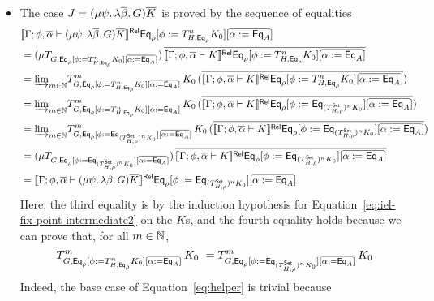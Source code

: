\documentclass{lmcs}
\theoremstyle{plain}\newtheorem{satz}[thm]{Satz}
\newcommand{\set}{\mathsf{Set}}
\begin{document}
\begin{itemize}
\begin{itemize}
\item 
  The case $J = (\mu \psi.\, \lambda \overline{\beta}.\, G) \overline{K}$
is proved by the sequence of equalities 
\[
\begin{split}
& \relsem{\Gamma; \phi, \ol{\alpha} \vdash (\mu \psi.\, \lambda
    \ol{\beta}.\, G) \ol{K}} 
  \Eq_{\rho} [\phi := T^{n}_{H,\Eq_{\rho}} K_0]
  [\overline{\alpha := \Eq_A}] \\
&= (\mu {T_{G, \Eq_{\rho}[\phi := T^{n}_{H,\Eq_{\rho}} K_0][\overline{\alpha := \Eq_A}]}})
  \,\ol{\relsem{\Gamma; \phi, \ol{\alpha} \vdash K}\Eq_{\rho}
  [\phi := T^{n}_{H,\Eq_{\rho}} K_0][\overline{\alpha := \Eq_A}]} \\ 
&= \colim{m \in \nat} {T^m_{G, \Eq_{\rho}[\phi := T^{n}_{H,\Eq_{\rho}} K_0][\overline{\alpha := \Eq_A}]}}\,K_0
  \,(\ol{\relsem{\Gamma; \phi, \ol{\alpha} \vdash K}\Eq_{\rho}
  [\phi := T^{n}_{H,\Eq_{\rho}} K_0][\overline{\alpha := \Eq_A}]}) \\ 
&= \colim{m \in \nat} {T^m_{G, \Eq_{\rho}[\phi := T^{n}_{H,\Eq_{\rho}} K_0][\overline{\alpha := \Eq_A}]}}\,K_0
  \,(\ol{\relsem{\Gamma; \phi, \ol{\alpha} \vdash K}\Eq_{\rho}
  [\phi := \Eq_{(T^{\set}_{H,\rho})^n K_0}][\overline{\alpha := \Eq_A}]}) \\  %
&= \colim{m \in \nat} {T^m_{G, \Eq_{\rho}[\phi := \Eq_{(T^{\set}_{H,\rho})^n K_0}][\overline{\alpha := \Eq_A}]}}\,K_0
  \,(\ol{\relsem{\Gamma; \phi, \ol{\alpha} \vdash K}\Eq_{\rho}
  [\phi := \Eq_{(T^{\set}_{H,\rho})^n K_0}][\overline{\alpha := \Eq_A}]}) \\ 
&= (\mu {T_{G, \Eq_{\rho}[\phi := \Eq_{(T^{\set}_{H,\rho})^n K_0}][\overline{\alpha := \Eq_A}]}})
  \,\ol{\relsem{\Gamma; \phi, \ol{\alpha} \vdash K}\Eq_{\rho}
  [\phi := \Eq_{(T^{\set}_{H,\rho})^n K_0}][\overline{\alpha := \Eq_A}]} \\ 
&= \relsem{\Gamma; \phi, \ol{\alpha} \vdash (\mu \psi.\, \lambda \beta.\, G) \ol{K}}
  \Eq_{\rho}[\phi := \Eq_{(T^{\set}_{H,\rho})^n K_0}][\overline{\alpha := \Eq_{A}}]
\end{split}
\]
Here, the third equality is by the induction hypothesis for
Equation~\ref{eq:iel-fix-point-intermediate2} on the $K$s, and the
fourth equality holds because we can prove that, for all $m \in \mathbb{N}$,
\begin{equation}\label{eq:helper}
T^m_{G,
\Eq_{\rho}[\phi := T^{n}_{H,\Eq_{\rho}} K_0][\overline{\alpha :=
    \Eq_A}]}\,K_0 \ = T^m_{G, \Eq_{\rho}[\phi :=
    \Eq_{(T^{\set}_{H,\rho})^n K_0}][\overline{\alpha :=
      \Eq_A}]}\,K_0
\end{equation}
Indeed, the base case of Equation~\ref{eq:helper} is trivial because

\end{itemize}
\end{itemize}
\end{document}
